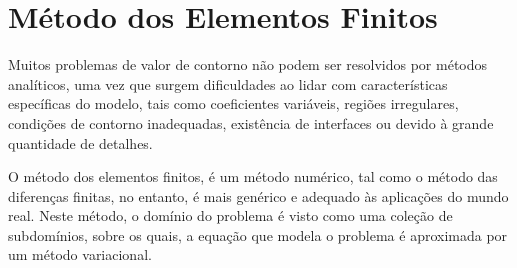 \section{Método dos Elementos Finitos}

Muitos problemas de valor de contorno não podem ser resolvidos por métodos analíticos, uma vez que surgem dificuldades ao lidar com características específicas do modelo, tais como coeficientes variáveis, regiões irregulares, condições de contorno inadequadas, existência de interfaces ou devido à grande quantidade de detalhes.
\citep[p. 410]{powers}

O método dos elementos finitos, é um método numérico, tal como o método das diferenças finitas, no entanto, é mais genérico e adequado às aplicações do mundo real. Neste método, o domínio do problema é visto como uma coleção de subdomínios, sobre os quais, a equação que modela o problema é aproximada por um método variacional.
\citep[p. 13]{reddy}


